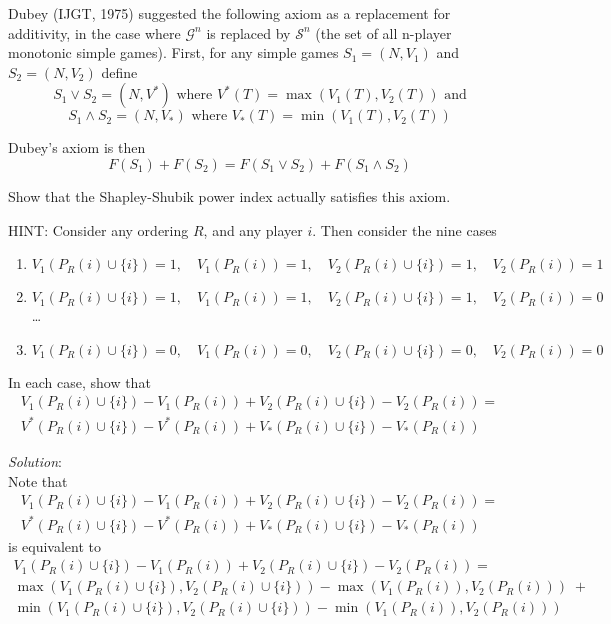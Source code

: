 \documentclass{article}
\begin{document}
\begin{enumerate}
Dubey (IJGT, 1975) suggested the following axiom as a replacement for additivity, in the case where $\mathcal{G}^{n}$ is replaced by $\mathcal{S}^{n}$ (the set of all n-player monotonic simple games). First, for any simple games $S_{1} = (N, V_{1})$ and $S_{2} = (N, V_{2})$ define
\[ S_{1} \vee S_{2}   = (N, V^{*}) \text{ where } V^{*}(T) = \max(V_{1}(T), V_{2}(T)) \text{ and} \]
\[ S_{1} \wedge S_{2} = (N, V_{*}) \text{ where } V_{*}(T) = \min(V_{1}(T), V_{2}(T)) \]

Dubey's axiom is then
\[ F(S_{1}) + F(S_{2}) = F(S_{1} \vee S_{2}) + F(S_{1} \wedge S_{2}) \]

Show that the Shapley-Shubik power index actually satisfies this axiom.

HINT: Consider any ordering $R$, and any player $i$. Then consider the nine cases
  \renewcommand{\labelenumii}{\roman{enumii})}
  \begin{enumerate}
  \item $V_{1}(P_{R}(i) \cup \{i\}) = 1, \quad V_{1}(P_{R}(i)) = 1, \quad V_{2}(P_{R}(i) \cup \{i\}) = 1, \quad V_{2}(P_{R}(i)) = 1$
  \item $V_{1}(P_{R}(i) \cup \{i\}) = 1, \quad V_{1}(P_{R}(i)) = 1, \quad V_{2}(P_{R}(i) \cup \{i\}) = 1, \quad V_{2}(P_{R}(i)) = 0$ \\
  \dots
  \setcounter{enumii}{8}
  \item $V_{1}(P_{R}(i) \cup \{i\}) = 0, \quad V_{1}(P_{R}(i)) = 0, \quad V_{2}(P_{R}(i) \cup \{i\}) = 0, \quad V_{2}(P_{R}(i)) = 0$
  \end{enumerate}

In each case, show that
\begin{multline*}
V_{1}(P_{R}(i) \cup \{i\}) - V_{1}(P_{R}(i)) + V_{2}(P_{R}(i) \cup \{i\}) - V_{2}(P_{R}(i)) = \\
    V^{*}(P_{R}(i) \cup \{i\}) - V^{*}(P_{R}(i)) + V_{*}(P_{R}(i) \cup \{i\}) - V_{*}(P_{R}(i))
\end{multline*}

\textit{Solution}:\\

Note that
\begin{multline*}
V_{1}(P_{R}(i) \cup \{i\}) - V_{1}(P_{R}(i)) + V_{2}(P_{R}(i) \cup \{i\}) - V_{2}(P_{R}(i)) = \\
    V^{*}(P_{R}(i) \cup \{i\}) - V^{*}(P_{R}(i)) + V_{*}(P_{R}(i) \cup \{i\}) - V_{*}(P_{R}(i))
\end{multline*}
is equivalent to 
\begin{multline*}
V_{1}(P_{R}(i) \cup \{i\}) - V_{1}(P_{R}(i)) + V_{2}(P_{R}(i) \cup \{i\}) - V_{2}(P_{R}(i)) = \\
    \max(V_{1}(P_{R}(i) \cup \{i\}), V_{2}(P_{R}(i) \cup \{i\})) - \max(V_{1}(P_{R}(i)), V_{2}(P_{R}(i))) \; + \\
    \min(V_{1}(P_{R}(i) \cup \{i\}), V_{2}(P_{R}(i) \cup \{i\})) - \min(V_{1}(P_{R}(i)), V_{2}(P_{R}(i)))
\end{multline*} \\


\end{enumerate}
\end{document}
